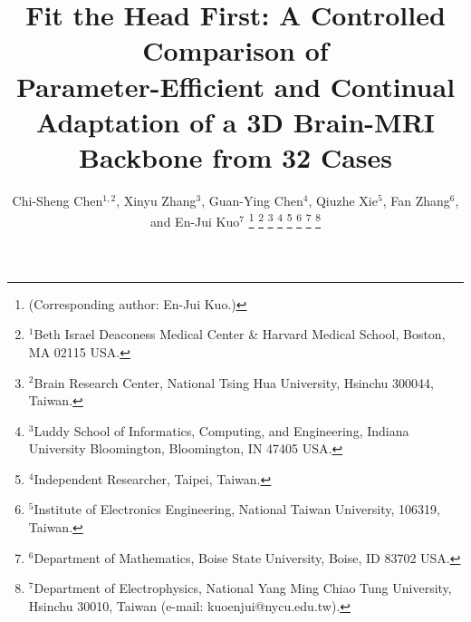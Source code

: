 \iffull\documentclass[journal]{IEEEtran}\else\documentclass[journal,twoside,web]{ieeecolor}\usepackage{generic}\fi
\begin{document}
\title{Fit the Head First: A Controlled Comparison of\iffull{} \else\\\fi Parameter-Efficient and Continual Adaptation of a 3D Brain-MRI Backbone from 32 Cases}


\makeatletter\newcommand{\tabinput}[1]{\@@input #1 }\makeatother
\newcommand{\fullonly}[2]{\iffull #1\else #2\fi}  %

\author{Chi-Sheng Chen$^{1,2}$,
Xinyu Zhang$^{3}$,
Guan-Ying Chen$^{4}$,
Qiuzhe Xie$^{5}$,
Fan Zhang$^{6}$,
and En-Jui Kuo$^{7}$
\thanks{(Corresponding author: En-Jui Kuo.)}
\thanks{$^{1}$Beth Israel Deaconess Medical Center \& Harvard Medical School, Boston, MA 02115 USA.}
\thanks{$^{2}$Brain Research Center, National Tsing Hua University, Hsinchu 300044, Taiwan.}
\thanks{$^{3}$Luddy School of Informatics, Computing, and Engineering, Indiana University Bloomington, Bloomington, IN 47405 USA.}
\thanks{$^{4}$Independent Researcher, Taipei, Taiwan.}
\thanks{$^{5}$Institute of Electronics Engineering, National Taiwan University, 106319, Taiwan.}
\thanks{$^{6}$Department of Mathematics, Boise State University, Boise, ID 83702 USA.}
\thanks{$^{7}$Department of Electrophysics, National Yang Ming Chiao Tung University, Hsinchu 30010, Taiwan (e-mail: kuoenjui@nycu.edu.tw).}}

\maketitle
\end{document}
